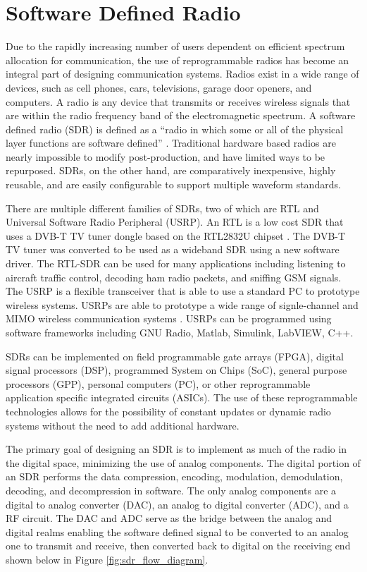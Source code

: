 \section{Software Defined Radio}
Due to the rapidly increasing number of users dependent on efficient spectrum allocation for communication, the use of reprogrammable radios has become an integral part of designing communication systems. Radios exist in a wide range of devices, such as cell phones, cars, televisions, garage door openers, and computers. A radio is any device that transmits or receives wireless signals that are within the radio frequency band of the electromagnetic spectrum. A software defined radio (SDR) is defined as a “radio in which some or all of the physical layer functions are software defined” \cite{sdr_forum}. Traditional hardware based radios are nearly impossible to modify post-production, and have limited ways to be repurposed. SDRs, on the other hand, are comparatively inexpensive, highly reusable, and are easily configurable to support multiple waveform standards.\par
There are multiple different families of SDRs, two of which are RTL and Universal Software Radio Peripheral (USRP). An RTL is a low cost SDR that uses a DVB-T TV tuner dongle based on the RTL2832U chipset \cite{rtl_sdr}. The DVB-T TV tuner was converted to be used as a wideband SDR using a new software driver. The RTL-SDR can be used for many applications including listening to aircraft traffic control, decoding ham radio packets, and sniffing GSM signals. The USRP is a flexible transceiver that is able to use a standard PC to prototype wireless systems. USRPs are able to prototype a wide range of signle-channel and MIMO wireless communication systems \cite{USRP_NI}. USRPs can be programmed using software frameworks including GNU Radio, Matlab, Simulink, LabVIEW, C++.\par
SDRs can be implemented on field programmable gate arrays (FPGA), digital signal processors (DSP), programmed System on Chips (SoC), general purpose processors (GPP), personal computers (PC), or other reprogrammable application specific integrated circuits (ASICs). The use of these reprogrammable technologies allows for the possibility of constant updates or dynamic radio systems without the need to add additional hardware. \par
The primary goal of designing an SDR is to implement as much of the radio in the digital space, minimizing the use of analog components. The digital portion of an SDR performs the data compression, encoding, modulation, demodulation, decoding, and decompression in software. The only analog components are a digital to analog converter (DAC), an analog to digital converter (ADC), and a RF circuit. The DAC and ADC serve as the bridge between the analog and digital realms enabling the software defined signal to be converted to an analog one to transmit and receive, then converted back to digital on the receiving end shown below in Figure \ref{fig:sdr_flow_diagram}.
